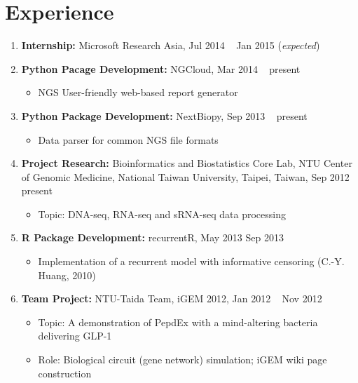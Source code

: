 \documentclass[11pt, a4paper]{scrartcl}
\begin{document}
\section*{Experience}
\begin{enumerate}
    \item \textbf{Internship:} Microsoft Research Asia, Jul 2014 \textendash~ Jan 2015 (\textit{expected})

    \item \textbf{Python Pacage Development:} NGCloud, Mar 2014 \textendash~ present
        \begin{itemize}
            \item NGS User-friendly web-based report generator
        \end{itemize}

    \item \textbf{Python Package Development:} NextBiopy, Sep 2013 \textendash~ present
        \begin{itemize}
            \item Data parser for common NGS file formats
        \end{itemize}

    \item \textbf{Project Research:} Bioinformatics and Biostatistics Core Lab, NTU Center of Genomic Medicine, National Taiwan University, Taipei, Taiwan, Sep 2012 \textendash~ present
        \begin{itemize}
            \item Topic: DNA-seq, RNA-seq and sRNA-seq data processing
        \end{itemize}

    \item \textbf{R Package Development:} recurrentR, May 2013 \textendash Sep 2013
        \begin{itemize}
            \item Implementation of a recurrent model with informative censoring (C.-Y. Huang, 2010)
        \end{itemize}

    \item \textbf{Team Project:} NTU-Taida Team, iGEM 2012, Jan 2012 \textendash~ Nov 2012
        \begin{itemize}
            \item Topic: A demonstration of PepdEx with a mind-altering bacteria delivering GLP-1
            \item Role: Biological circuit (gene network) simulation; iGEM wiki page construction
        \end{itemize}


\end{enumerate}
\end{document}
